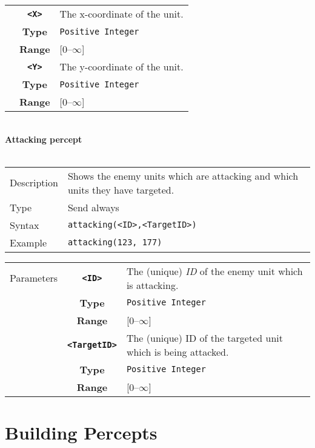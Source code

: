 \begin{tabularx}{\textwidth}{l | c | p{8cm}|}
            \cline{2-3}
            & \textbf{\verb|<X>|} & The x-coordinate of the unit.\\
            & \textbf{Type} & \verb|Positive Integer| \\
            & \textbf{Range} & [0--$\infty$] \\
            \cline{2-3}
            & \textbf{\verb|<Y>|} & The y-coordinate of the unit.\\
            & \textbf{Type} & \verb|Positive Integer| \\
            & \textbf{Range} & [0--$\infty$] \\
            \cline{2-3}
\end{tabularx}\\

\newpage
\noindent
\textbf{Attacking percept}\\
\\
\begin{tabularx}{\textwidth}{lX}
 Description & Shows the enemy units which are attacking and which units they have targeted. \\
 Type & Send always \\
 Syntax & \verb|attacking(<ID>,<TargetID>)| \\
 Example & \verb|attacking(123, 177)| \\
 \end{tabularx}
 \begin{tabularx}{\textwidth}{l | c | p{8cm}|}
 \cline{2-3}
 Parameters & \textbf{\verb|<ID>|} & The (unique) \textit{ID} of the enemy unit which is attacking. \\
            & \textbf{Type} & \verb|Positive Integer| \\
            & \textbf{Range} & [0--$\infty$] \\
            \cline{2-3}
            & \textbf{\verb|<TargetID>|} & The (unique) ID of the targeted unit which is being attacked. \\
            & \textbf{Type} & \verb|Positive Integer| \\
            & \textbf{Range} & [0--$\infty$] \\
            \cline{2-3}
\end{tabularx}

\section{Building Percepts}

